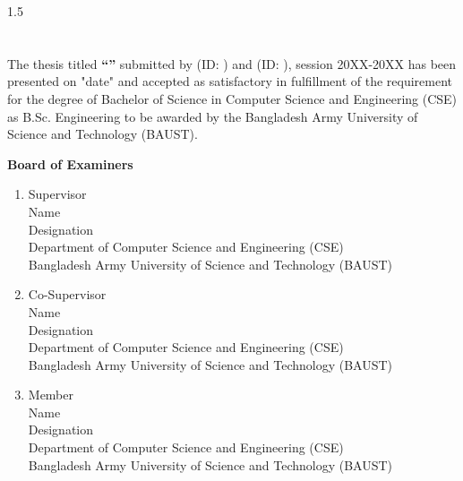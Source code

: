 \vfill %
\begin{spacing}{1.5}
\section*{}The thesis titled \textbf{``\thesistitle''} submitted by \studentOneName{} (ID: \studentOneID) and \studentTwoName{} (ID: \studentTwoID), session 20XX-20XX has been presented on "date" and accepted as satisfactory in fulfillment of the requirement for the degree of Bachelor of Science in Computer Science and Engineering (CSE) as B.Sc. Engineering to be awarded by the Bangladesh Army University of Science and Technology (BAUST).

\vfill %
\begin{center}
    \textbf{\large{Board of Examiners}}
\end{center}
\vfill

\begin{enumerate}
\vspace{.35in}
\item \textbf{\hrulefill} \hspace{6.5 cm}   Supervisor \\
    Name \\
    Designation \\
    Department of Computer Science and Engineering (CSE) \\
    Bangladesh Army University of Science and Technology (BAUST)

\vfill %
\vspace{.35in}
\item \textbf{\hrulefill} \hspace{5.8 cm}  Co-Supervisor \\
    Name \\
    Designation \\
    Department of Computer Science and Engineering (CSE) \\
    Bangladesh Army University of Science and Technology (BAUST)

    
\vfill %
\vspace{.35in}
\item \textbf{\hrulefill} \hspace{6.9 cm}  Member \\
    Name \\
    Designation \\
    Department of Computer Science and Engineering (CSE) \\
    Bangladesh Army University of Science and Technology (BAUST)


\end{enumerate}

\end{spacing}
